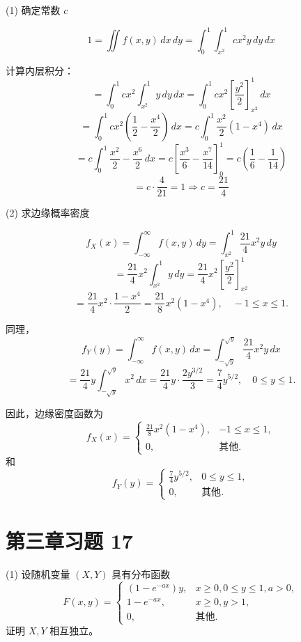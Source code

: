 \documentclass[twoside]{article}
\begin{document}
\begin{ans}{9}{9}
    (1) 确定常数 \( c \)

    \[
    1 = \iint f(x, y) \, dx \, dy = \int_0^1 \int_{x^2}^1 cx^2 y \, dy \, dx
    \]
    
    计算内层积分：
    \[
    = \int_0^1 c x^2 \int_{x^2}^1 y \, dy \, dx = \int_0^1 c x^2 \left[ \frac{y^2}{2} \right]_{x^2}^1 \, dx
    \]
    \[
    = \int_0^1 c x^2 \left( \frac{1}{2} - \frac{x^4}{2} \right) \, dx = c \int_0^1 \frac{x^2}{2} (1 - x^4) \, dx
    \]
    \[
    = c \int_0^1 \frac{x^2}{2} - \frac{x^6}{2} \, dx = c \left[ \frac{x^3}{6} - \frac{x^7}{14} \right]_0^1 = c \left( \frac{1}{6} - \frac{1}{14} \right)
    \]
    \[
    = c \cdot \frac{4}{21} = 1 \Rightarrow c = \frac{21}{4}
    \]
    
    (2) 求边缘概率密度
    
    \[
    f_X(x) = \int_{-\infty}^{\infty} f(x, y) \, dy = \int_{x^2}^1 \frac{21}{4} x^2 y \, dy
    \]
    \[
    = \frac{21}{4} x^2 \int_{x^2}^1 y \, dy = \frac{21}{4} x^2 \left[ \frac{y^2}{2} \right]_{x^2}^1
    \]
    \[
    = \frac{21}{4} x^2 \cdot \frac{1 - x^4}{2} = \frac{21}{8} x^2 (1 - x^4), \quad -1 \leq x \leq 1.
    \]
    
    同理，
    \[
    f_Y(y) = \int_{-\infty}^{\infty} f(x, y) \, dx = \int_{-\sqrt{y}}^{\sqrt{y}} \frac{21}{4} x^2 y \, dx
    \]
    \[
    = \frac{21}{4} y \int_{-\sqrt{y}}^{\sqrt{y}} x^2 \, dx = \frac{21}{4} y \cdot \frac{2y^{3/2}}{3} = \frac{7}{4} y^{5/2}, \quad 0 \leq y \leq 1.
    \]
    
    因此，边缘密度函数为
    \[
    f_X(x) = 
    \begin{cases} 
    \frac{21}{8} x^2 (1 - x^4), & -1 \leq x \leq 1, \\
    0, & \text{其他}.
    \end{cases}
    \]
    和
    \[
    f_Y(y) = 
    \begin{cases} 
    \frac{7}{4} y^{5/2}, & 0 \leq y \leq 1, \\
    0, & \text{其他}.
    \end{cases}
    \]
\end{ans}

\section{第三章习题 17}

(1) 设随机变量 \( (X, Y) \) 具有分布函数
\[
F(x, y) = 
\begin{cases} 
(1 - e^{-ax})y, & x \geq 0, 0 \leq y \leq 1, a > 0, \\
1 - e^{-ax}, & x \geq 0, y > 1, \\
0, & \text{其他}.
\end{cases}
\]
证明 \( X, Y \) 相互独立。
\end{document}
